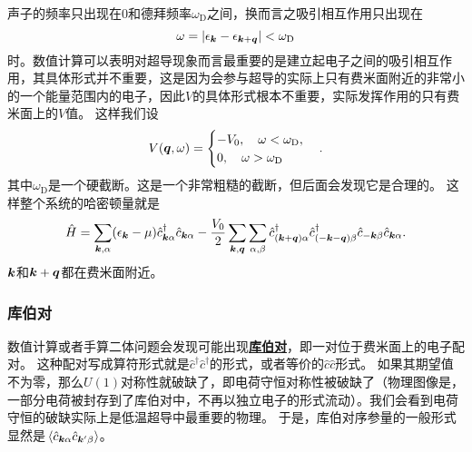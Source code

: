 \documentclass[hyperref, UTF8, a4paper]{ctexart}
\newcommand*{\concept}[1]{\underline{\textbf{#1}}}
\begin{document}
声子的频率只出现在0和德拜频率$\omega_\text{D}$之间，换而言之吸引相互作用只出现在
\[
    \omega = \abs{\epsilon_{\vb*{k}} - \epsilon_{\vb*{k}+\vb*{q}}} < \omega_\text{D}
\]
时。数值计算可以表明对超导现象而言最重要的是建立起电子之间的吸引相互作用，其具体形式并不重要，这是因为会参与超导的实际上只有费米面附近的非常小的一个能量范围内的电子，因此$V$的具体形式根本不重要，实际发挥作用的只有费米面上的$V$值。
这样我们设
\begin{equation}
    V(\vb*{q}, \omega) = \begin{cases}
        - V_0, \quad \omega < \omega_\text{D}, \\
        0, \quad \omega > \omega_\text{D}
    \end{cases}.
    \label{eq:superconductive-interaction-simplified}
\end{equation}
其中$\omega_\text{D}$是一个硬截断。这是一个非常粗糙的截断，但后面会发现它是合理的。
这样整个系统的哈密顿量就是
\begin{equation}
    \hat{H} = \sum_{\vb*{k}, \alpha} (\epsilon_{\vb*{k}} - \mu) \hat{c}_{\vb*{k} \alpha}^\dagger \hat{c}_{\vb*{k} \alpha} - \frac{V_0}{2} \sum_{\vb*{k}, \vb*{q}} \sum_{\alpha, \beta} \hat{c}^\dagger_{(\vb*{k} + \vb*{q}) \alpha} \hat{c}^\dagger_{( - \vb*{k} - \vb*{q}) \beta} \hat{c}_{-\vb*{k} \beta} \hat{c}_{\vb*{k} \alpha}.
    \label{eq:simple-super-conductive-hamiltonian}
\end{equation}
$\vb*{k}$和$\vb*{k}+\vb*{q}$都在费米面附近。

\subsubsection{库伯对}

数值计算或者手算二体问题会发现可能出现\concept{库伯对}，即一对位于费米面上的电子配对。
这种配对写成算符形式就是$\hat{c}^\dagger \hat{c}^\dagger$的形式，或者等价的$\hat{c} \hat{c}$形式。
如果其期望值不为零，那么$U(1)$对称性就破缺了，即电荷守恒对称性被破缺了（物理图像是，一部分电荷被封存到了库伯对中，不再以独立电子的形式流动）。我们会看到电荷守恒的破缺实际上是低温超导中最重要的物理。
于是，库伯对序参量的一般形式显然是$\expval*{\hat{c}_{\vb*{k}\alpha} \hat{c}_{\vb*{k}' \beta}}$。
\end{document}
